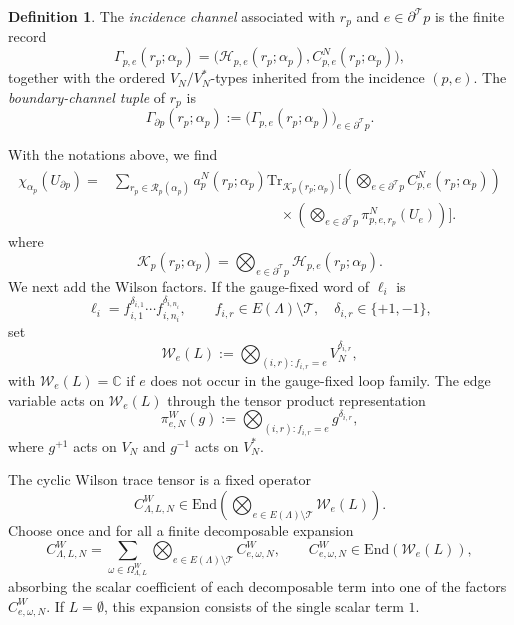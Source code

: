 \documentclass[11pt,a4paper,reqno]{amsart}
\theoremstyle{definition}
\newtheorem{definition}[theorem]{Definition}
\theoremstyle{remark}
\newcommand\C{{\mathbb C}}
\newcommand\Tr{{\mathrm{Tr}}}
\newcommand\End{{\mathrm{End}}}
\begin{document}
\begin{definition}
The \emph{incidence channel} associated with $r_p$ and $e\in\partial^{\mathcal T} p$ is the finite record
\[
\Gamma_{p,e}(r_p;\alpha_p)=\bigl(\mathcal H_{p,e}(r_p;\alpha_p),C^N_{p,e}(r_p;\alpha_p)\bigr),
\]
together with the ordered $V_N/V_N^*$-types inherited from the incidence $(p,e)$. The \emph{boundary-channel tuple} of $r_p$ is
\[
\Gamma_{\partial p}(r_p;\alpha_p):=\bigl(\Gamma_{p,e}(r_p;\alpha_p)\bigr)_{e\in\partial^{\mathcal T} p}.
\]
\end{definition}
With the notations above, we find
\begin{align*}
\chi_{\alpha_p}(U_{\partial p})
={}&\sum_{r_p\in\mathcal R_p(\alpha_p)}a_p^N(r_p;\alpha_p)
\Tr_{\mathcal K_p(r_p;\alpha_p)}\Bigg[
\left(\bigotimes_{e\in\partial^{\mathcal T}p}C^N_{p,e}(r_p;\alpha_p)\right)\\
&\hspace{5cm}\times
\left(\bigotimes_{e\in\partial^{\mathcal T}p}\pi^N_{p,e,r_p}(U_e)\right)
\Bigg].
\end{align*}
where
\[
\mathcal K_p(r_p;\alpha_p)=\bigotimes_{e\in\partial^{\mathcal T} p}\mathcal H_{p,e}(r_p;\alpha_p).
\]
We next add the Wilson factors. If the gauge-fixed word of $\ell_i$ is
\[
\ell_i=f_{i,1}^{\delta_{i,1}}\cdots f_{i,n_i}^{\delta_{i,n_i}},\qquad f_{i,r}\in E(\Lambda)\setminus\mathcal T,\quad \delta_{i,r}\in\{+1,-1\},
\]
set
\[
\mathcal W_e(L):=\bigotimes_{(i,r): f_{i,r}=e} V_N^{\delta_{i,r}},
\]
with $\mathcal W_e(L)=\C$ if $e$ does not occur in the gauge-fixed loop family. The edge variable acts on $\mathcal W_e(L)$ through the tensor product representation
\[
\pi^W_{e,N}(g):=\bigotimes_{(i,r): f_{i,r}=e} g^{\delta_{i,r}},
\]
where $g^{+1}$ acts on $V_N$ and $g^{-1}$ acts on $V_N^*$.

The cyclic Wilson trace tensor is a fixed operator
\[
C^W_{\Lambda,L,N}\in
\End\left(\bigotimes_{e\in E(\Lambda)\setminus\mathcal T}\mathcal W_e(L)\right).
\]
Choose once and for all a finite decomposable expansion
\[
C^W_{\Lambda,L,N}=\sum_{\omega\in\Omega^W_{\Lambda,L}}\bigotimes_{e\in E(\Lambda)\setminus\mathcal T} C^W_{e,\omega,N},\qquad C^W_{e,\omega,N}\in\End(\mathcal W_e(L)),
\]
absorbing the scalar coefficient of each decomposable term into one of the factors $C^W_{e,\omega,N}$. If $L=\emptyset$, this expansion consists of the single scalar term $1$.
\end{document}
